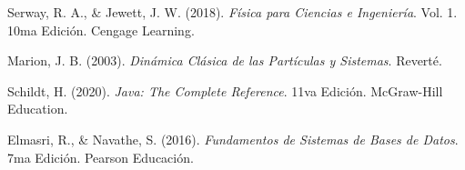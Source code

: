 \documentclass[11pt,a4paper]{article}
\begin{document}
	\begin{enumerate}[label={[ \arabic* ]}]
		\item Serway, R. A., \& Jewett, J. W. (2018). \textit{Física para Ciencias e Ingeniería}. Vol. 1. 10ma Edición. Cengage Learning.
		\item Marion, J. B. (2003). \textit{Dinámica Clásica de las Partículas y Sistemas}. Reverté.
		\item Schildt, H. (2020). \textit{Java: The Complete Reference}. 11va Edición. McGraw-Hill Education.
		\item Elmasri, R., \& Navathe, S. (2016). \textit{Fundamentos de Sistemas de Bases de Datos}. 7ma Edición. Pearson Educación.
	\end{enumerate}
	
	
\end{document}
